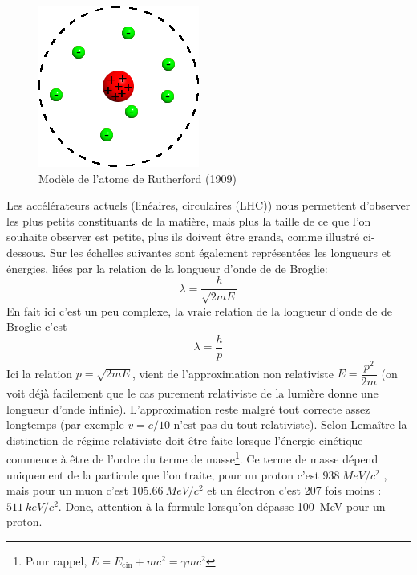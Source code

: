 \begin{figure}[ht]
    \centering
    \includegraphics[scale=0.65]{Images1/modelerutherford.png}
    \caption{Modèle de l'atome de Rutherford (1909)}
    \label{fig:modele_rutherford}
\end{figure}

Les accélérateurs actuels (linéaires, circulaires (LHC)) nous permettent d'observer les plus petits constituants de la matière, mais plus la taille de ce que l'on souhaite observer est petite, plus ils doivent être grands, comme illustré ci-dessous. Sur les échelles suivantes sont également représentées les longueurs et énergies, liées par la relation de la longueur d'onde de de Broglie:
\[ \lambda=\dfrac{h}{\sqrt{2mE}} \]
En fait ici c'est un peu complexe, la vraie relation de la longueur d'onde de de Broglie c'est
\[\lambda=\dfrac{h}{p}\]
Ici la relation $p = \sqrt{2mE}$, vient de l'approximation non relativiste $E = \dfrac{p^{2}}{2m}$ (on voit déjà facilement que le cas purement relativiste de la lumière donne une longueur d'onde infinie). L'approximation reste malgré tout correcte assez longtemps (par exemple $v = c/10$ n'est pas du tout relativiste). Selon Lemaître la distinction de régime relativiste doit être faite lorsque l'énergie cinétique commence à être de l'ordre du terme de masse\footnote{Pour rappel, $E = E_\text{cin} + mc^2 = \gamma mc^2$}. Ce terme de masse dépend uniquement de la particule que l'on traite, pour un proton c'est $\SI{938}{MeV}/c^2$ , mais pour un muon c'est $\SI{105.66}{MeV}/c^2$ et un électron c'est 207 fois moins : $\SI{511}{keV}/c^2$. Donc, attention à la formule lorsqu'on dépasse \SI{100}{MeV} pour un proton.

